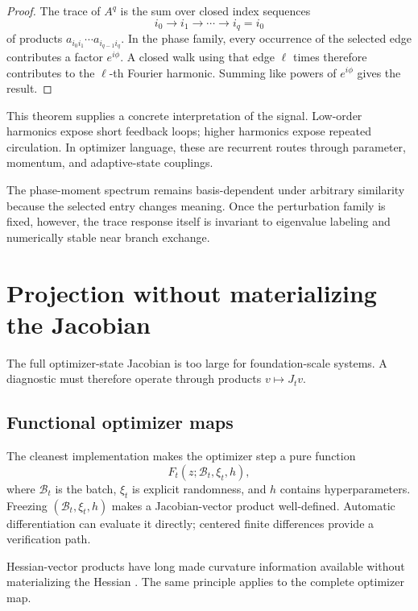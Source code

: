 \begin{proof}
The trace of \(A^q\) is the sum over closed index sequences
\[
i_0\to i_1\to\cdots\to i_q=i_0
\]
of products \(a_{i_0i_1}\cdots a_{i_{q-1}i_q}\).  In the phase family, every occurrence of the selected edge contributes a factor \(e^{i\phi}\).  A closed walk using that edge \(\ell\) times therefore contributes to the \(\ell\)-th Fourier harmonic.  Summing like powers of \(e^{i\phi}\) gives the result.
\end{proof}

This theorem supplies a concrete interpretation of the signal.  Low-order harmonics expose short feedback loops; higher harmonics expose repeated circulation.  In optimizer language, these are recurrent routes through parameter, momentum, and adaptive-state couplings.

\begin{remark}
The phase-moment spectrum remains basis-dependent under arbitrary similarity because the selected entry changes meaning.  Once the perturbation family is fixed, however, the trace response itself is invariant to eigenvalue labeling and numerically stable near branch exchange.
\end{remark}

\section{Projection without materializing the Jacobian}

The full optimizer-state Jacobian is too large for foundation-scale systems.  A diagnostic must therefore operate through products \(v\mapsto J_tv\).

\subsection{Functional optimizer maps}

The cleanest implementation makes the optimizer step a pure function
\[
F_t(z;\mathcal B_t,\xi_t,h),
\]
where \(\mathcal B_t\) is the batch, \(\xi_t\) is explicit randomness, and \(h\) contains hyperparameters.  Freezing \((\mathcal B_t,\xi_t,h)\) makes a Jacobian-vector product well-defined.  Automatic differentiation can evaluate it directly; centered finite differences provide a verification path.

Hessian-vector products have long made curvature information available without materializing the Hessian \cite{pearlmutter1994}.  The same principle applies to the complete optimizer map.

